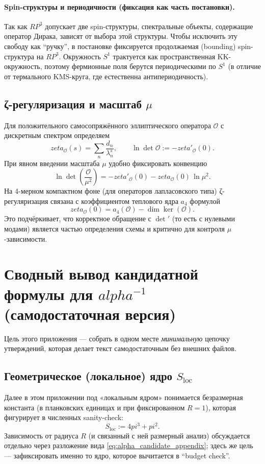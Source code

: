 \documentclass[12pt]{article}
\def\mathbb#1{#1}%
\def\alpha{alpha}%
\def\pi{pi}%
\def\zeta{zeta}%
\begin{document}
\paragraph{Spin-структуры и периодичности (фиксация как часть постановки).}
Так как $\mathbb{RP}^3$ допускает две spin-структуры, спектральные объекты, содержащие оператор Дирака, зависят от выбора этой структуры.
Чтобы исключить эту свободу как ``ручку'', в постановке фиксируется продолжаемая (bounding) spin-структура на $\mathbb{RP}^3$.
Окружность $S^1$ трактуется как пространственная KK-окружность, поэтому фермионные поля берутся периодическими по $S^1$ (в отличие от термального KMS-круга, где естественна антипериодичность).

\subsection{ζ-регуляризация и масштаб $\mu$}
Для положительного самосопряжённого эллиптического оператора $\mathcal{O}$ с дискретным спектром определяем
\begin{equation}
  \zeta_{\mathcal{O}}(s)=\sum_{n}\frac{d_n}{\lambda_n^s},
  \qquad
  \ln\det\mathcal{O}:=-\zeta'_{\mathcal{O}}(0).
\end{equation}
При явном введении масштаба $\mu$ удобно фиксировать конвенцию
\begin{equation}
  \ln\det\!\left(\frac{\mathcal{O}}{\mu^2}\right)=-\zeta'_{\mathcal{O}}(0)-\zeta_{\mathcal{O}}(0)\,\ln\mu^2.
\end{equation}
На 4-мерном компактном фоне (для операторов лапласовского типа) ζ-регуляризация связана с коэффициентом теплового ядра $a_4$ формулой
\begin{equation}
  \zeta_{\mathcal{O}}(0)=a_4(\mathcal{O})-\dim\ker(\mathcal{O}).
\end{equation}
Это подчёркивает, что корректное обращение с $\det'$ (то есть с нулевыми модами) является частью определения схемы и критично для контроля $\mu$-зависимости.

\section{Сводный вывод кандидатной формулы для $\alpha^{-1}$ (самодостаточная версия)}
Цель этого приложения --- собрать в одном месте \emph{минимальную} цепочку утверждений, которая делает текст самодостаточным без внешних файлов.

\subsection{Геометрическое (локальное) ядро $S_{\mathrm{loc}}$}
Далее в этом приложении под «локальным ядром» понимается безразмерная константа
(в планковских единицах и при фиксированном $R=1$), которая фигурирует в численных sanity-check:
\begin{equation}
  S_{\mathrm{loc}}:=4\pi^3+\pi^2.
\end{equation}
Зависимость от радиуса $R$ (и связанный с ней размерный анализ) обсуждается отдельно через разложение вида \eqref{eq:alpha_candidate_appendix}; здесь же цель — зафиксировать именно то ядро, которое вычитается в ``budget check''.
\end{document}
